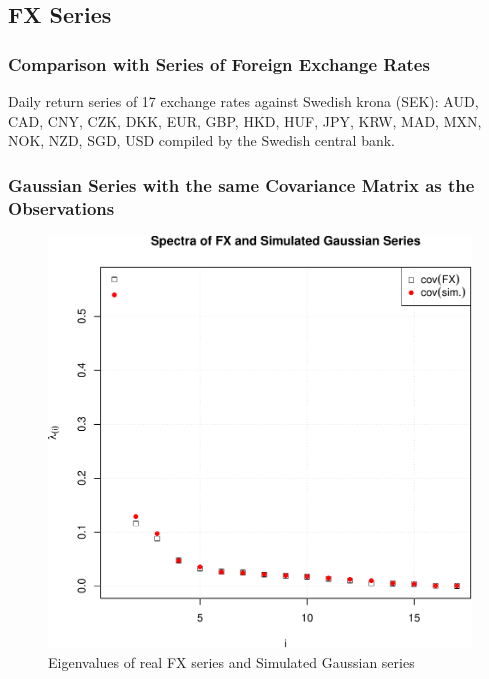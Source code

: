 \documentclass{beamer}
\begin{document}
\subsection{FX Series}
\begin{frame}
  \frametitle{Comparison with Series of Foreign Exchange Rates}
  Daily return series of 17 exchange rates against Swedish krona (SEK):
  AUD,
  CAD,
  CNY,
  CZK,
  DKK,
  EUR,
  GBP,
  HKD,
  HUF,
  JPY,
  KRW,
  MAD,
  MXN,
  NOK,
  NZD,
  SGD,
  USD
  compiled by the Swedish central bank.
\end{frame}

\begin{frame}
  \frametitle{Gaussian Series with the same Covariance Matrix as the
    Observations}
  \begin{figure}[htb!]
    \centering
    \includegraphics[scale=0.4]{Gaussian_eigenvalues.pdf}
    \caption{\scriptsize Eigenvalues of real FX series and Simulated Gaussian series}
  \end{figure}
\end{frame}
\end{document}
